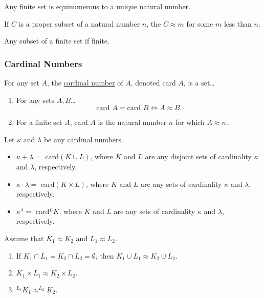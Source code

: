 \begin{corollary}
Any finite set is equinumerous to a unique natural number.
\end{corollary}

\begin{lemma}
If $C$ is a proper subset of a natural number $n$, the $C \approx m$ for some $m$ less than $n$.
\end{lemma}

\begin{corollary}
Any subset of a finite set if finite.
\end{corollary}

\subsubsection{Cardinal Numbers}\label{cardinalnumberdefinition}

For any set $A$, the \hyperref[ordinalnumbers]{cardinal number} of $A$, denoted card $A$, is a set\dots
\begin{enumerate}
  \item For any sets $A,B$\dots
  	$$\textrm{card } A = \textrm{card }B \Leftrightarrow A \approx B.$$
  \item For a finite set $A$, card $A$ is the natural number $n$ for which $A \approx n$.
\end{enumerate}

Let $\kappa$ and $\lambda$ be any cardinal numbers.
\begin{itemize}
  \item $\kappa + \lambda =$ card$(K \cup L)$, where $K$ and $L$ are any disjoint sets of cardinality $\kappa$ and $\lambda$, respectively.
  \item $\kappa \cdot \lambda =$ card$(K \times L)$, where $K$ and $L$ are any sets of cardinality $\kappa$ and $\lambda$, respectively.
  \item $\kappa^{\lambda} =$ card$^LK$, where $K$ and $L$ are any sets of cardinality $\kappa$ and $\lambda$, respectively.
\end{itemize}

\begin{proposition}
Assume that $K_1 \approx K_2$ and $L_1 \approx L_2$.
\begin{enumerate}
  \item If $K_1 \cap L_1 = K_2 \cap L_2 = \emptyset$, then $K_1 \cup L_1 \approx K_2 \cup L_2$.
  \item $K_1 \times L_1 \approx K_2 \times L_2.$
  \item $^{L_1}K_1 \approx ^{L_2}K_2.$
\end{enumerate}
\end{proposition}

